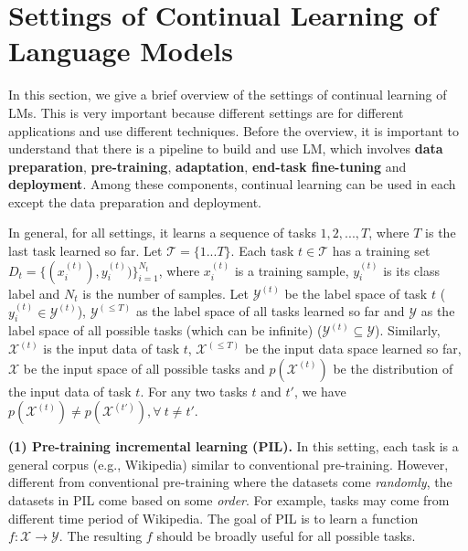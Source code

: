 \documentclass{article} \usepackage{iclr2023_conference,times}
\newcommand{\zixuan}[1]{{\color{red}{\small\bf\sf [zixuan: #1]}}}
\begin{document}
\iffalse
{\color{red}
\section{Settings of Continual Learning of Language Models}
\label{sec.setting}


In this section, we give a brief overview of the settings of continual learning of LMs. This is very important because different settings are for different applications and use different techniques. Before the overview, it is important to understand that there is a pipeline to build and use LM, which involves \textbf{data preparation}, \textbf{pre-training}, \textbf{adaptation}, \textbf{end-task fine-tuning} and \textbf{deployment}. Among these components, continual learning can be used in each except the data preparation and deployment. 

In general, for all settings, it learns a sequence of tasks $1, 2, ..., T$, where $T$ is the last task learned so far. Let $\mathcal{T}=\{1...T\}$. Each task $t \in \mathcal{T}$ has a training set $D_t=\{(x^{(t)}_i),y^{(t)}_i)\}_{i=1}^{N_t}$, where $x^{(t)}_i$ is a training sample, $y^{(t)}_i$ is its class label and $N_t$ is the number of samples. Let $\mathcal{Y}^{(t)}$ be the label space of task $t$ ($y^{(t)}_i \in \mathcal{Y}^{(t)}$), $\mathcal{Y}^{(\leq T)}$ as the label space of all tasks learned so far and $\mathcal{Y}$ as the label space of all possible tasks (which can be infinite) ($\mathcal{Y}^{(t)} \subseteq \mathcal{Y}$). 
Similarly, $\mathcal{X}^{(t)}$ is the input data of task $t$, $\mathcal{X}^{(\leq T)}$ be the input data space learned so far, $\mathcal{X}$ be the input space of all possible tasks and
$p(\mathcal{X}^{(t)})$ be the distribution of the input data of task $t$. For any two tasks $t$ and $t'$, we have $p(\mathcal{X}^{(t)}) \neq p(\mathcal{X}^{(t')}), \forall~t \ne t'$. 

\textbf{(1) Pre-training incremental learning (PIL).} In this setting, each task is a general corpus (e.g., Wikipedia) similar to conventional pre-training. However, different from conventional pre-training where the datasets come \textit{randomly}, the datasets in PIL come based on some \textit{order}. For example, tasks may come from different time period of Wikipedia. The goal of PIL is to learn a function $f: \mathcal{X} \to \mathcal{Y}$. The resulting $f$ should be broadly useful for all possible tasks. 

\zixuan{I think the goal should show the goal of generalization. there are may still have forgetting issue because of misalignment. No work on PIL yet}

}
\end{document}
